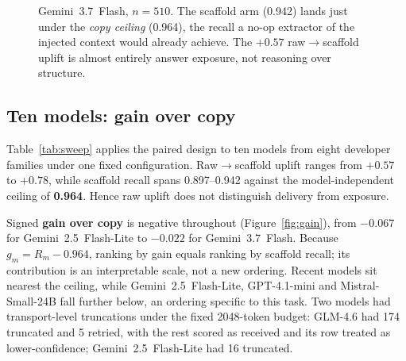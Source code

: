 \documentclass[10pt,twocolumn]{article}
\begin{document}
\begin{figure}[t]\centering
{}
\caption{Gemini~3.7~Flash, $n=510$. The scaffold arm (0.942) lands just under the \emph{copy ceiling}
(0.964), the recall a no-op extractor of the injected context would already achieve. The $+0.57$
raw$\to$scaffold uplift is almost entirely answer exposure, not reasoning over structure.}
\label{fig:anchor}
\end{figure}

\subsection{Ten models: gain over copy}\label{sec:tenmodel}
Table~\ref{tab:sweep} applies the paired design to ten models from eight developer families under one fixed configuration. Raw$\to$scaffold uplift ranges from $+0.57$ to $+0.78$, while scaffold recall spans 0.897--0.942 against the model-independent ceiling of \textbf{0.964}. Hence raw uplift does not distinguish delivery from exposure.

Signed \textbf{gain over copy} is negative throughout (Figure~\ref{fig:gain}), from $-0.067$ for Gemini~2.5~Flash-Lite to $-0.022$ for Gemini~3.7~Flash. Because $g_m=R_m-0.964$, ranking by gain equals ranking by scaffold recall; its contribution is an interpretable scale, not a new ordering. Recent models sit nearest the ceiling, while Gemini~2.5~Flash-Lite, GPT-4.1-mini and Mistral-Small-24B fall further below, an ordering specific to this task. Two models had transport-level truncations under the fixed 2048-token budget: GLM-4.6 had 174 truncated and 5 retried, with the rest scored as received and its row treated as lower-confidence; Gemini~2.5~Flash-Lite had 16 truncated.
\end{document}
